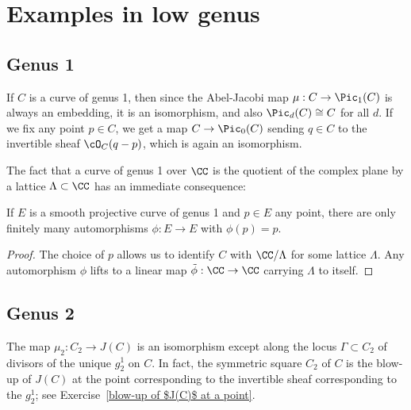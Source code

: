 \section{Examples in low genus}

\subsection{Genus 1} 

If $C$ is a curve of genus 1, then since the Abel-Jacobi map $\mu : C \to \Pic_1(C)$ is always an embedding, it is an isomorphism, and also $\Pic_d(C) \cong C$ for all $d$. If we fix any point $p \in C$, we get a map $C \to \Pic_0(C)$ sending $q \in C$ to the invertible sheaf $\cO_C(q-p)$, which is again an isomorphism.

The fact that a curve of genus 1 over $\CC$ is the quotient of the complex plane by a lattice $\Lambda \subset \CC$ has an immediate consequence:

\begin{corollary}\label{finite automorphism genus 1}
If $E$ is a smooth projective curve of genus 1 and $p \in E$ any point, there are only finitely many automorphisms $\phi : E \to E$ with $\phi(p) = p$.
\end{corollary}

\begin{proof} The choice of $p$ allows us to identify $C$ with $\CC/\Lambda$ for some lattice $\Lambda.$
Any automorphism $\phi$ lifts to a linear map $\tilde \phi : \CC \to \CC$ carrying $\Lambda$ to itself.
\end{proof} 


\subsection{Genus 2}

The map $\mu_2 : C_{2} \to J(C)$ is an isomorphism except along the locus $\Gamma \subset  C_{2} $ of divisors of the unique $g^1_2$ on $C$. In fact, the symmetric square $ C_{2} $ of $C$ is the blow-up of $J(C)$ at the point corresponding to the invertible sheaf corresponding to the
$g^1_2$; see Exercise~\ref{blow-up of $J(C)$ at a point}.


